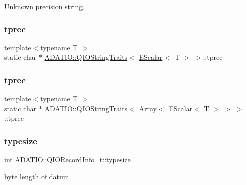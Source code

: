 Unknown precision string. 

\mbox{\label{group__qio_ga3fb5d4202ab2a67bf71bdcc4de33b02d}} 
\subsubsection{\texorpdfstring{tprec}{tprec}\hspace{0.1cm}{\footnotesize\ttfamily [2/3]}}
{\footnotesize\ttfamily template$<$typename T $>$ \\
static char $\ast$ \mbox{\hyperlink{structADATIO_1_1QIOStringTraits}{A\+D\+A\+T\+I\+O\+::\+Q\+I\+O\+String\+Traits}}$<$ \mbox{\hyperlink{classENSEM_1_1EScalar}{E\+Scalar}}$<$ T $>$ $>$\+::tprec\hspace{0.3cm}{\ttfamily [static]}}

\mbox{\label{group__qio_ga6aa642ed522f9f49dc8a9eae8abd273a}} 
\subsubsection{\texorpdfstring{tprec}{tprec}\hspace{0.1cm}{\footnotesize\ttfamily [3/3]}}
{\footnotesize\ttfamily template$<$typename T $>$ \\
static char $\ast$ \mbox{\hyperlink{structADATIO_1_1QIOStringTraits}{A\+D\+A\+T\+I\+O\+::\+Q\+I\+O\+String\+Traits}}$<$ \mbox{\hyperlink{classXMLArray_1_1Array}{Array}}$<$ \mbox{\hyperlink{classENSEM_1_1EScalar}{E\+Scalar}}$<$ T $>$ $>$ $>$\+::tprec\hspace{0.3cm}{\ttfamily [static]}}

\mbox{\label{group__qio_ga415fb0076e8a07dddb97c8c5d6ea08f9}} 
\subsubsection{\texorpdfstring{typesize}{typesize}}
{\footnotesize\ttfamily int A\+D\+A\+T\+I\+O\+::\+Q\+I\+O\+Record\+Info\+\_\+t\+::typesize}

byte length of datum 
